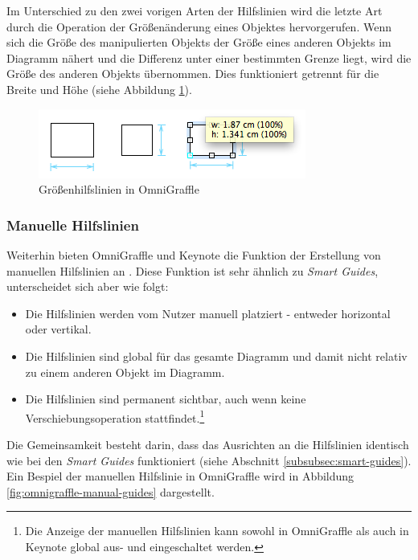 Im Unterschied zu den zwei vorigen Arten der Hilfslinien wird die letzte Art durch die Operation der Größenänderung eines Objektes hervorgerufen. Wenn sich die Größe des manipulierten Objekts der Größe eines anderen Objekts im Diagramm nähert und die Differenz unter einer bestimmten Grenze liegt, wird die Größe des anderen Objekts übernommen. Dies funktioniert getrennt für die Breite und Höhe (siehe Abbildung \ref{fig:omnigraffle-sizing-guides}).

\begin{figure}[hbt]
    \centering
    \includegraphics{resources/omnigraffle-sizing-guides.png}
    \caption{Größenhilfslinien in OmniGraffle}
    \label{fig:omnigraffle-sizing-guides}
\end{figure}

\subsubsection{Manuelle Hilfslinien}

Weiterhin bieten OmniGraffle und Keynote die Funktion der Erstellung von manuellen Hilfslinien an \cite{08OmniGraffle, 11Keynote}. Diese Funktion ist sehr ähnlich zu \textit{Smart Guides}, unterscheidet sich aber wie folgt:

\begin{itemize}
    \item Die Hilfslinien werden vom Nutzer manuell platziert - entweder horizontal oder vertikal.
    \item Die Hilfslinien sind global für das gesamte Diagramm und damit nicht relativ zu einem anderen Objekt im Diagramm.
    \item Die Hilfslinien sind permanent sichtbar, auch wenn keine Verschiebungsoperation stattfindet.\footnote{Die Anzeige der manuellen Hilfslinien kann sowohl in OmniGraffle als auch in Keynote global aus- und eingeschaltet werden.}
\end{itemize}

Die Gemeinsamkeit besteht darin, dass das Ausrichten an die Hilfslinien identisch wie bei den \textit{Smart Guides} funktioniert (siehe Abschnitt \ref{subsubsec:smart-guides}). Ein Bespiel der manuellen Hilfslinie in OmniGraffle wird in Abbildung \ref{fig:omnigraffle-manual-guides} dargestellt.

